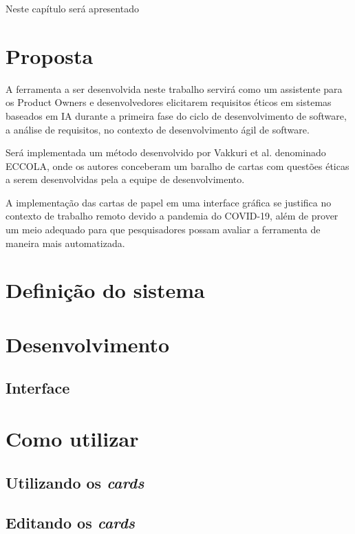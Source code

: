\label{desenvolvimento}

Neste capítulo será apresentado 


\section{Proposta}

A ferramenta a ser desenvolvida neste trabalho servirá como um assistente para os Product Owners e desenvolvedores elicitarem requisitos éticos em sistemas baseados em IA durante a primeira fase do ciclo de desenvolvimento de software, a análise de requisitos, no contexto de desenvolvimento ágil de software.

Será implementada um método desenvolvido por Vakkuri et al. \cite{ECCOLA} denominado ECCOLA, onde os autores conceberam um baralho de cartas com questões éticas a serem desenvolvidas pela a equipe de desenvolvimento.

A implementação das cartas de papel em uma interface gráfica se justifica no contexto de trabalho remoto devido a pandemia do COVID-19, além de prover um meio adequado para que pesquisadores possam avaliar a ferramenta de maneira mais automatizada.

\section{Definição do sistema}

\section{Desenvolvimento}

\subsection{Interface}

\section{Como utilizar}

\subsection{Utilizando os \textit{cards}}

\subsection{Editando os \textit{cards}}
